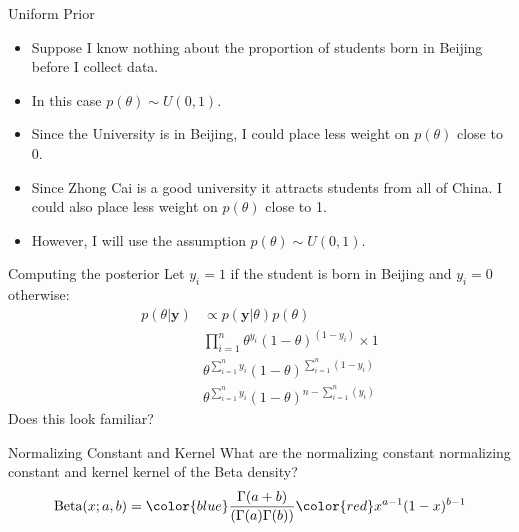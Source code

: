 \documentclass[10pt]{beamer}
\begin{document}
\begin{frame}{Uniform Prior}
  \begin{itemize}
  \item Suppose I know nothing about the proportion of students born in Beijing before I collect data.

  \item In this case $p(\theta)\sim U(0,1)$.

  \item Since the University is in Beijing, I could place less weight on $p(\theta)$ close to 0.

  \item Since Zhong Cai is a good university it attracts students from all of China. I could also place less weight on $p(\theta)$ close to 1.

  \item However, I will use the assumption $p(\theta)\sim U(0,1)$.
  \end{itemize}
\end{frame}
\begin{frame}{Computing the posterior}
  Let $y_i=1$ if the student is born in Beijing and $y_i=0$ otherwise:
  \begin{align}
    p(\theta|{\bm y})&\propto p({\bm y}|\theta)p(\theta)\\
                     &\prod_{i=1}^n \theta^{y_i}(1-\theta)^{(1-y_i)}\times 1\\
                     &\theta^{\sum\nolimits_{i=1}^ny_i}(1-\theta)^{\sum\nolimits_{i=1}^n(1-y_i)}\\
                     &\theta^{\sum\nolimits_{i=1}^ny_i}(1-\theta)^{n-\sum\nolimits_{i=1}^n(y_i)}
  \end{align}
  Does this look familiar?
\end{frame}
\begin{frame}{Normalizing Constant and Kernel}
  What are the
  { normalizing constant}{{\color{blue} normalizing constant}}
  and
  {kernel}{{\color{red} kernel}}
  of the Beta density?
{
    \begin{equation}
      \mbox{Beta}(x;a,b)={\color{blue}\frac{\Gamma(a+b)}{(\Gamma(a)\Gamma(b))}}{\color{red}x^{a-1}(1-x)^{b-1}}
    \end{equation}
  }

\end{frame}
\end{document}
